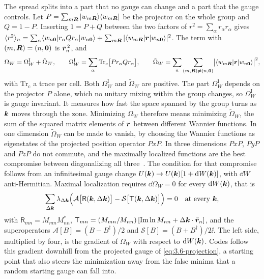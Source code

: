 The spread splits into a part that no gauge can change and a part that the gauge controls. Let $P = \sum_{m\bm{R}}|w_{m\bm{R}}\rangle\langle w_{m\bm{R}}|$ be the projector on the whole group and $Q = 1 - P$. Inserting $1 = P + Q$ between the two factors of $r^2 = \sum_\alpha r_\alpha r_\alpha$ gives $\langle r^2\rangle_n = \sum_\alpha\langle w_{n\bm{0}}|r_\alpha Qr_\alpha|w_{n\bm{0}}\rangle + \sum_{m\bm{R}}|\langle w_{m\bm{R}}|\bm{r}|w_{n\bm{0}}\rangle|^2$. The term with $(m,\bm{R}) = (n,\bm{0})$ is $\bar{\bm{r}}_n^{\,2}$, and~\cite[Eqs.~(13)--(16)]{marzari1997maximally}
\begin{equation}
  \Omega_W = \Omega_W^{\mathrm{I}} + \tilde\Omega_W, \qquad
  \Omega_W^{\mathrm{I}} = \sum_\alpha\mathrm{Tr}_{\mathrm{c}}\bigl[P r_\alpha Q r_\alpha\bigr], \qquad
  \tilde\Omega_W = \sum_n\sum_{(m,\bm{R})\ne(n,\bm{0})}\bigl|\langle w_{m\bm{R}}|\bm{r}|w_{n\bm{0}}\rangle\bigr|^2 ,
  \label{eq:3.6-split}
\end{equation}
with $\mathrm{Tr}_{\mathrm{c}}$ a trace per cell. Both $\Omega_W^{\mathrm{I}}$ and $\tilde\Omega_W$ are positive. The part $\Omega_W^{\mathrm{I}}$ depends on the projector $P$ alone, which no unitary mixing within the group changes, so $\Omega_W^{\mathrm{I}}$ is gauge invariant. It measures how fast the space spanned by the group turns as $\bm{k}$ moves through the zone. Minimizing $\Omega_W$ therefore means minimizing $\tilde\Omega_W$, the sum of the squared matrix elements of $\bm{r}$ between different Wannier functions. In one dimension $\tilde\Omega_W$ can be made to vanish, by choosing the Wannier functions as eigenstates of the projected position operator $PxP$. In three dimensions $PxP$, $PyP$ and $PzP$ do not commute, and the maximally localized functions are the best compromise between diagonalizing all three~\cite[Sect.~III]{marzari1997maximally}. The condition for that compromise follows from an infinitesimal gauge change $U(\bm{k}) \to U(\bm{k})[1 + \mathrm{d} W(\bm{k})]$, with $\dd W$ anti-Hermitian. Maximal localization requires $\dd\Omega_W = 0$ for every $\mathrm{d} W(\bm{k})$, that is~\cite[Eq.~(52)]{marzari1997maximally}
\begin{equation}
  \sum_{\Delta\bm{k}}\lambda_{\Delta\bm{k}}\Bigl(\mathcal{A}\bigl[\mathsf{R}(\bm{k},\Delta\bm{k})\bigr] - \mathcal{S}\bigl[\mathsf{T}(\bm{k},\Delta\bm{k})\bigr]\Bigr) = 0
  \quad\text{at every }\bm{k},
  \label{eq:3.6-stationary}
\end{equation}
with $\mathsf{R}_{mn} = M_{mn}M^*_{nn}$, $\mathsf{T}_{mn} = (M_{mn}/M_{nn})\,[\mathrm{Im}\ln M_{nn} + \Delta\bm{k}\cdot\bar{\bm{r}}_n]$, and the superoperators $\mathcal{A}[B] = (B - B^\dagger)/2$ and $\mathcal{S}[B] = (B + B^\dagger)/2\ii$. The left side, multiplied by four, is the gradient of $\Omega_W$ with respect to $\mathrm{d} W(\bm{k})$. Codes follow this gradient downhill from the projected gauge of \cref{eq:3.6-projection}, a starting point that also steers the minimization away from the false minima that a random starting gauge can fall into.

